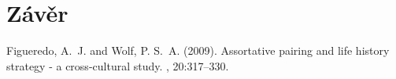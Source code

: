 \documentclass[12pt]{article} %
\begin{document}







\section{Závěr} %

\lipsum[12-13]


\begin{thebibliography}{99} %

Figueredo, A.~J. and Wolf, P. S.~A. (2009).
\newblock Assortative pairing and life history strategy - a cross-cultural
  study.
, 20:317--330.
 
\end{thebibliography}

\end{document}
